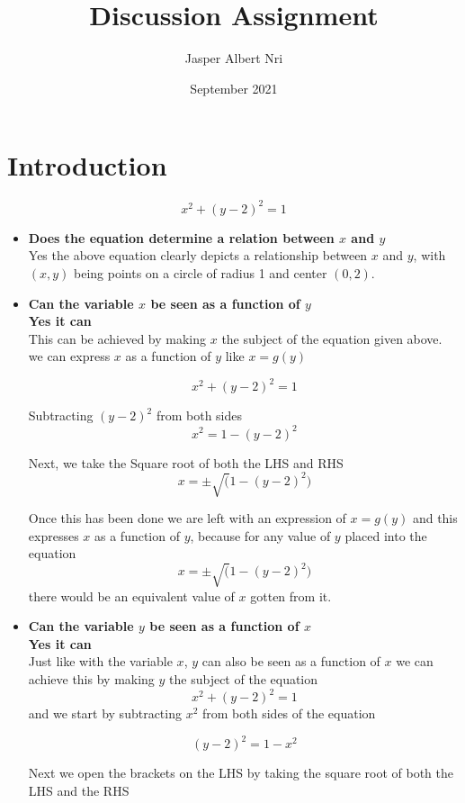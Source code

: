 \documentclass{article}
\title{Discussion Assignment}
\author{Jasper Albert Nri}
\date{September 2021}
\begin{document}
\maketitle

\section*{Introduction}
$${x^2 + (y-2)^2 = 1}$$
\begin{itemize}
    \item \textbf{Does the equation determine a relation between ${x}$ and ${y}$} \\
    Yes the above equation clearly depicts a relationship between ${x}$ and ${y}$, with ${(x,y)}$ being points on a circle of radius 1 and center ${(0,2)}$.
    

    \item \textbf{Can the variable ${x}$ be seen as a function of ${y}$\\
    Yes it can} \\
    This can be achieved by making ${x}$ the subject of the equation given above. we can express ${x}$ as a function of ${y}$ like ${x = g(y)}$
    
    $${x^2 + (y-2)^2 = 1}$$
    
    Subtracting ${(y-2)^2}$ from both sides
    $${x^2 = 1 - (y-2)^2}$$
    
    Next, we take the Square root of both the LHS and RHS
    $${x = \pm\sqrt(1 - (y-2)^2)}$$
    
    Once this has been done we are left with an expression of ${x=g(y)}$
    and this expresses ${x}$ as a function of ${y}$, because for any value of ${y}$ placed into the equation $${x = \pm\sqrt(1 - (y-2)^2)}$$ there would be an equivalent value of ${x}$ gotten from it.
    
    
    \item \textbf{Can the variable ${y}$ be seen as a function of ${x}$\\
    Yes it can}\\
    Just like with the variable ${x}$, ${y}$ can also be seen as a function of ${x}$
    we can achieve this by making ${y}$ the subject of the equation
    $${x^2 + (y-2)^2 = 1}$$
    and we start by subtracting  ${x^2}$ from both sides of the equation
    
    $${(y-2)^2 = 1 - x^2}$$
    
    Next we open the brackets on the LHS by taking the square root of both the LHS and the RHS
    

\end{itemize}
\end{document}

